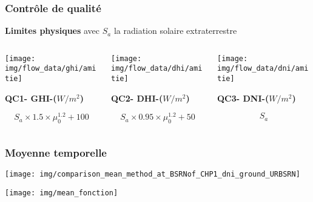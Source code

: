 \documentclass[8pt]{beamer}
\begin{document}
\begin{frame}
	\frametitle{Contrôle de qualité}
	\small %
	\vspace{0.1cm}
	\begin{center}
		\textbf{Limites physiques} avec $S_a$ la radiation solaire extraterrestre
	\end{center}
	
	\begin{columns}[T] %
		\begin{column}{0.3\linewidth} %
			\texttt{[image: img/flow\_data/ghi/amitie]}\\[1 pt]
			\begin{center}
				\textbf{QC1- GHI-($W/m^2$)}
			\end{center}
			\begin{equation}
				S_a \times 1.5 \times \mu_0^{1.2} + 100
			\end{equation}
		\end{column}
		\begin{column}{0.3\linewidth} %
			\texttt{[image: img/flow\_data/dhi/amitie]}\\[1pt]
			\begin{center}
				\textbf{QC2- DHI-($W/m^2$)}
			\end{center}
			\begin{equation}
				S_a \times 0.95 \times \mu_0^{1.2} + 50
			\end{equation}
		\end{column}
		\begin{column}{0.3\linewidth} %
			\texttt{[image: img/flow\_data/dni/amitie]}\\[1pt]
			\begin{center}
				\textbf{QC3- DNI-($W/m^2$)}
			\end{center}
			\begin{equation}
				S_a
			\end{equation}
		\end{column}
	\end{columns}
\end{frame}

\begin{frame}
	\frametitle{Moyenne temporelle}
	
	\begin{minipage}[c][\textheight][t]{0.58\textwidth}
		\centering
		\texttt{[image: img/comparison\_mean\_method\_at\_BSRNof\_CHP1\_dni\_ground\_URBSRN]}
	\end{minipage}
	\hfill
	\begin{minipage}[c][\textheight][t]{0.37\textwidth}
		\centering
		\texttt{[image: img/mean\_fonction]}
	\end{minipage}
\end{frame}
\end{document}
